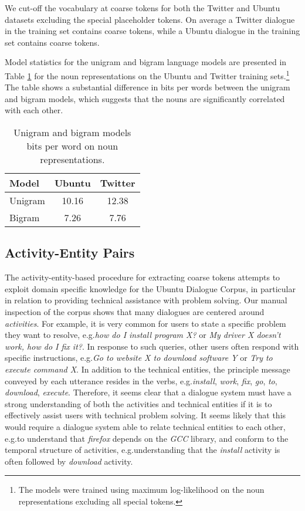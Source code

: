 \documentclass{article}
\begin{document}
We cut-off the vocabulary at  coarse tokens for both the Twitter and Ubuntu datasets excluding the special placeholder tokens. On average a Twitter dialogue in the training set contains  coarse tokens, while a Ubuntu dialogue in the training set contains  coarse tokens.

Model statistics for the unigram and bigram language models are presented in Table \ref{table:noun-rep-bits-per-word} for the noun representations on the Ubuntu and Twitter training sets.\footnote{The models were trained using maximum log-likelihood on the noun representations excluding all special tokens.}
The table shows a substantial difference in bits per words between the unigram and bigram models, which suggests that the nouns are significantly correlated with each other.

\begin{table}[t]
  \caption{Unigram and bigram models bits per word on noun representations.}
  \label{table:noun-rep-bits-per-word}
  \small
  \centering
  \begin{tabular}{lcc}
    \toprule
    Model & \textbf{Ubuntu} & \textbf{Twitter} \\ 
    \midrule
    Unigram & 10.16 & 12.38 \\
    Bigram & 7.26 & 7.76 \\
    \bottomrule
  \end{tabular}
 \end{table}
 
\subsection*{Activity-Entity Pairs}

The activity-entity-based procedure for extracting coarse tokens attempts to exploit domain specific knowledge for the Ubuntu Dialogue Corpus, in particular in relation to providing technical assistance with problem solving. Our manual inspection of the corpus shows that many dialogues are centered around \textit{activities}. For example, it is very common for users to state a specific problem they want to resolve, e.g.\@ \textit{how do I install program X?} or \textit{My driver X doesn't work, how do I fix it?}. In response to such queries, other users often respond with specific instructions, e.g.\@ \textit{Go to website X to download software Y} or \textit{Try to execute command X}. In addition to the technical entities, the principle message conveyed by each utterance resides in the verbs, e.g.\@ \textit{install}, \textit{work}, \textit{fix}, \textit{go}, \textit{to}, \textit{download}, \textit{execute}. Therefore, it seems clear that a dialogue system must have a strong understanding of both the activities and technical entities if it is to effectively assist users with technical problem solving. It seems likely that this would require a dialogue system able to relate technical entities to each other, e.g.\@ to understand that \textit{firefox} depends on the \textit{GCC} library, and conform to the temporal structure of activities, e.g.\@ understanding that the \textit{install} activity is often followed by \textit{download} activity.
\end{document}
